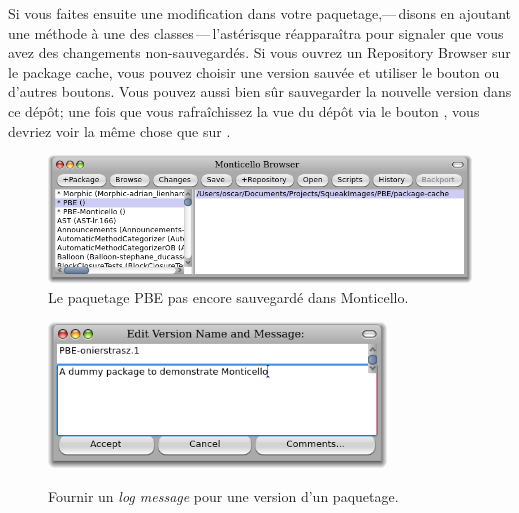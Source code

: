 \documentclass[a4paper,10pt,twoside]{book}
\begin{document}
Si vous faites ensuite une modification dans votre paquetage,---\,disons
en ajoutant une méthode à une des classes\,---\,l'astérisque réapparaîtra pour signaler que vous avez des changements non-sauvegardés.
Si vous ouvrez un Repository Browser sur le package cache, vous
pouvez choisir une version sauvée et utiliser le bouton 
ou d'autres boutons.
Vous pouvez aussi bien sûr sauvegarder la nouvelle version dans
ce dépôt; une fois que vous rafraîchissez la vue
du dépôt via le bouton , vous devriez voir
la même chose que sur
.

\begin{figure}[tbp]
	\begin{center}
		\includegraphics[width=\textwidth]{MC+PBE}
	\end{center}
	\caption{Le paquetage PBE pas encore sauvegardé dans Monticello.}
\end{figure}

\begin{figure}[tbp]
	\begin{center}
		{\includegraphics[width=0.8\textwidth]{PBE-on}}
	\end{center}
	\caption{Fournir un \emph{log message} pour une version d'un paquetage.}
\end{figure}
\end{document}
